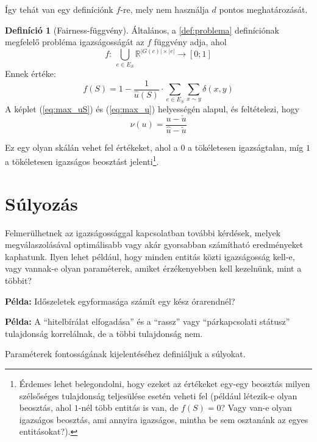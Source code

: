\documentclass[twocolumn]{article}
\theoremstyle{definition}
\newtheorem{definition}{Definíció}[section]
\newcommand{\pl}{ \textbf{Példa:} }
\begin{document}
    Így tehát van egy definíciónk $f$-re, mely nem használja $d$ pontos meghatározását.
    
    \begin{definition}[Fairness-függvény]
        Általános, a \ref{def:problema} definíciónak megfelelő probléma igazságosságát az $f$ függvény adja, ahol 
        \begin{equation}
            f: \ \bigcup_{e \in E_S} \mathbb{R}^{|G(e)| \times |e|} \to [0;1]
        \end{equation}
        Ennek értéke:
        \begin{equation}
            f(S) = 1 - \frac{1}{ \hat{u}(S) } \cdot \sum\limits_{e \in E_S} \sum\limits_{x \sim y} \delta(x,y)
        \end{equation}
        A képlet (\ref{eq:max_uS}) és (\ref{eq:max_u}) helyességén alapul, és feltételezi, hogy
        \begin{equation}
            \nu(u) = \frac{u - \check u}{\hat u - \check u}
        \end{equation}
    \end{definition}
    
    
    Ez egy olyan skálán vehet fel értékeket, ahol a $0$ a tökéletesen igazságtalan, míg $1$ a tökéletesen igazságos beosztást jelenti\footnote{Érdemes lehet belegondolni, hogy ezeket az értékeket egy-egy beosztás milyen szélsőséges tulajdonság teljesülése esetén veheti fel (például létezik-e olyan beosztás, ahol $1$-nél több entitás is van, de $f(S) = 0$? Vagy van-e olyan igazságos beosztás, ami annyira igazságos, mintha be sem osztanánk az egyes entitásokat?).}.

\section{Súlyozás}
    Felmerülhetnek az igazságossággal kapcsolatban további kérdések, melyek megválaszolásával optimálisabb vagy akár gyorsabban számítható eredményeket kaphatunk. Ilyen lehet például, hogy minden entitás közti igazságosság kell-e, vagy vannak-e olyan paraméterek, amiket érzékenyebben kell kezelnünk, mint a többit?
    
    \pl Időszeletek egyformasága számít egy kész órarendnél?
    
    \pl A \enquote{hitelbírálat elfogadása} és a \enquote{rassz} vagy \enquote{párkapcsolati státusz} tulajdonság korrelálnak, de a többi tulajdonság nem.
    
    Paraméterek fontosságának kijelentéséhez definiáljuk a súlyokat.
    
\end{document}
